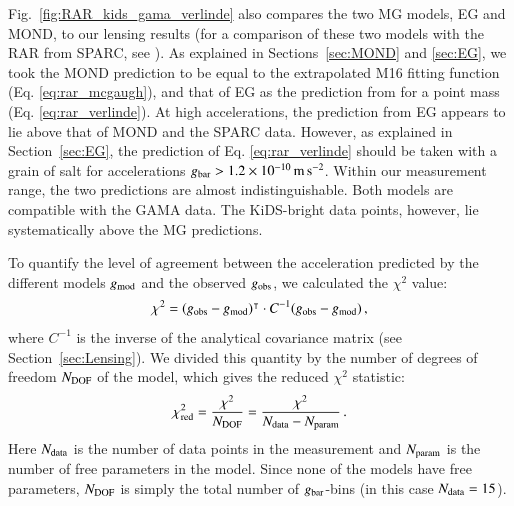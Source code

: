 \documentclass{aa}
\newcommand{\mpss}{\,{\rm m}\,{\rm s}^{-2} }
\newcommand*{\E}[1]{\times 10^{#1}}
\newcommand{\un}[1]{_{\rm #1}}
\begin{document}
Fig.~\ref{fig:RAR_kids_gama_verlinde} also compares the two MG models, EG and MOND, to our lensing results (for a comparison of these two models with the RAR from SPARC, see \citealt{lelli2017a}). As explained in Sections~\ref{sec:MOND} and \ref{sec:EG}, we took the MOND prediction to be equal to the extrapolated M16 fitting function (Eq. \ref{eq:rar_mcgaugh}), and that of EG as the prediction from \cite{verlinde2017} for a point mass (Eq. \ref{eq:rar_verlinde}). At high accelerations, the prediction from EG appears to lie above that of MOND and the SPARC data. However, as explained in Section~\ref{sec:EG}, the prediction of Eq. \ref{eq:rar_verlinde} should be taken with a grain of salt for accelerations $g\un{bar}>1.2\E{-10} \mpss$. Within our measurement range, the two predictions are almost indistinguishable. Both models are compatible with the GAMA data. The KiDS-bright data points, however, lie systematically above the MG predictions.

To quantify the level of agreement between the acceleration predicted by the different models $g\un{mod}$ and the observed $g\un{obs}$, we calculated the $\chi^2$ value:
\begin{equation}
\chi^2 = (g\un{obs} - g\un{mod})^\intercal \cdot C^{-1}(g\un{obs} - g\un{mod}) \, ,
\label{eq:chi2}
\end{equation}
where $C^{-1}$ is the inverse of the analytical covariance matrix (see Section~\ref{sec:Lensing}). We divided this quantity by the number of degrees of freedom $N\un{DOF}$ of the model, which gives the reduced $\chi^2$ statistic:
\begin{equation}
\chi\un{red}^2 = \frac{\chi^2}{N\un{DOF}} = \frac{\chi^2}{N\un{data} - N\un{param}} \, .
\end{equation}
Here $N\un{data}$ is the number of data points in the measurement and $N\un{param}$ is the number of free parameters in the model. Since none of the models have free parameters, $N\un{DOF}$ is simply the total number of $g\un{bar}$-bins (in this case $N\un{data}= 15$).
\end{document}
